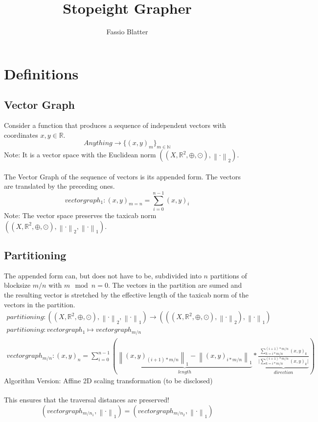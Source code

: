 \documentclass{report}
\newcommand\norm[1]{\left\lVert#1\right\rVert}
\begin{document}
\title{Stopeight Grapher}
\author{Fassio Blatter}
\maketitle

\chapter{Definitions}
\section{Vector Graph}
Consider a function that produces a sequence of independent vectors with coordinates $x,y \in \mathbb{R}$.
\begin{equation}
Anything \rightarrow \{(x,y)_{m}\}_{m \in \mathbb{N}}
\end{equation}
Note: It is a vector space with the Euclidean norm $((X,\mathbb{R}^2,\oplus,\odot),\norm{\cdot}_2)$.\\\\
The Vector Graph of the sequence of vectors is its appended form. The vectors are translated by the preceding ones.\\
\begin{equation}
vectorgraph_{1}: (x,y)_{m=n}=\sum_{i=0}^{n-1} (x,y)_{i}
\end{equation}
Note: The vector space preserves the taxicab norm $((X,\mathbb{R}^2,\oplus,\odot),\norm{\cdot}_2,\norm{\cdot}_1)$.
\section{Partitioning}
The appended form can, but does not have to be, subdivided into $n$ partitions of blocksize $m/n$ with $m\mod n=0$. The vectors in the partition are sumed and the resulting vector is stretched by the effective length of the taxicab norm of the vectors in the partition.
\begin{align}
partitioning: ((X,\mathbb{R}^2,\oplus,\odot),\norm{\cdot}_2,\norm{\cdot}_1) \rightarrow (((X,\mathbb{R}^2,\oplus,\odot),\norm{\cdot}_2),\norm{\cdot}_1)\\
partitioning: vectorgraph_{1} \mapsto vectorgraph_{m/n}\\
vectorgraph_{m/n}:(x,y)_{n}=\sum_{i=0}^{n-1} (\underbrace{\norm{(x,y)_{(i+1)*m/n}}_{1} - \norm{(x,y)_{i*m/n}}_{1}}_{length} * \underbrace{\frac{\sum_{k=i*m/n}^{(i+1)*m/n} (x,y)_{k}}{\vert \sum_{k=i*m/n}^{(i+1)*m/n} (x,y)_{k} \vert}}_{direction})
\end{align}
Algorithm Version: Affine 2D scaling transformation (to be disclosed)\\\\
This ensures that the traversal distances are preserved!
\begin{equation}
(vectorgraph_{m/n_{1}},\norm{\cdot}_{1})=(vectorgraph_{m/n_{2}},\norm{\cdot}_{1})\label{eq:9}
\end{equation}
\end{document}
